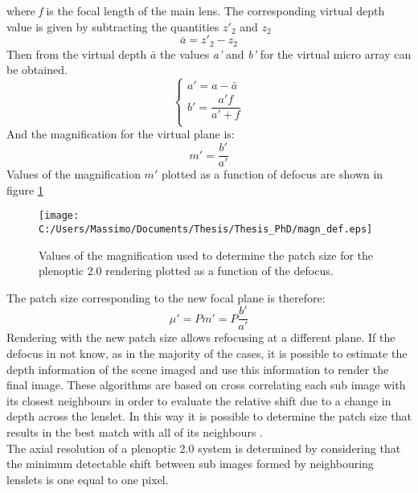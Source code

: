 where \textit{f} is the focal length of the main lens. The corresponding virtual depth value is given by subtracting the quantities $z'_2$ and $z_2$
\begin{equation}
\label{eq:def202}
\bar{a} = z'_2-z_2
\end{equation}
Then from the virtual depth $\bar{a}$ the values \textit{a'} and \textit{b'} for the virtual micro array can be obtained.
\begin{equation}
\begin{cases}
a' = a-\bar{a}   \\
b' = \dfrac{a'f}{a'+f} \\
\end{cases}
\end{equation}
And the magnification for the virtual plane is:
\begin{equation}
\label{eq:def204}
m' = \dfrac{b'}{a'}
\end{equation}
Values of the magnification $m'$ plotted as a function of defocus are shown in figure \ref{fig:def202}
\begin{figure}[H]
	\centering
	\texttt{[image: C:/Users/Massimo/Documents/Thesis/Thesis\_PhD/magn\_def.eps]}
	\caption{\label{fig:def202} Values of the magnification used to determine the patch size for the plenoptic 2.0 rendering plotted as a function of the defocus.  }
\end{figure}
The patch size corresponding to the new focal plane is therefore:
\begin{equation}
	\label{eq:patch2}
	\mu' = Pm' = P\dfrac{b'}{a'}
\end{equation}
Rendering with the new patch size allows refocusing at a different plane. If the defocus in not know, as in the majority of the cases, it is possible to estimate the depth information of the scene imaged and use this information to render the final image. These algorithms are based on cross correlating each sub image with its closest neighbours in order to evaluate the relative shift due to a change in depth across the lenslet\cite{hansen2011depth,johannsen2013calibration}. In this way it is possible to determine the patch size that results in the best match with all of its neighbours \cite{georgiev2010focused,lumsdaine2008full}.  \\
The axial resolution of a plenoptic 2.0 system is determined by considering that the minimum detectable shift between sub images formed by neighbouring lenslets is one equal to one pixel. 
